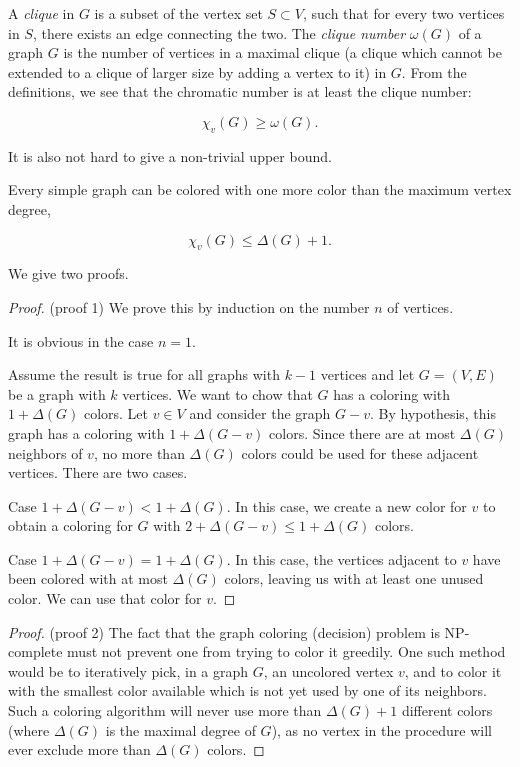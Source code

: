 A {\it clique} in $G$ is a subset of the vertex set $S \subset V$, such that
for every two vertices in $S$, there exists an edge connecting the two.
The {\it clique number} $\omega (G)$ of a graph $G$ is the number of vertices 
in a maximal clique (a clique which cannot be extended to a clique of 
larger size
by adding a vertex to it) in $G$.
From the definitions, we see that
the chromatic number is at least the clique number:

\[
    \chi_v(G) \ge \omega(G).
\]

It is also not hard to give a non-trivial upper bound.

\begin{theorem} 
Every simple graph can be colored with one more color than the 
maximum vertex degree,

\[
    \chi_v(G) \le \Delta(G) + 1. 
\]
\end{theorem}

We give two proofs.

\begin{proof}
(proof 1)
We prove this by induction on the number $n$ of vertices.

It is obvious in the case $n=1$.

Assume the result is true for all graphs with $k-1$ vertices and let
$G=(V,E)$ be a graph with $k$ vertices. We want to chow that $G$ has a
coloring with $1+\Delta(G)$ colors. Let $v\in V$ and consider the
graph $G-v$. By hypothesis, this graph has a coloring with
$1+\Delta(G-v)$ colors. Since there are at most $\Delta(G)$
neighbors of $v$, no more than $\Delta(G)$ colors could be used for 
these adjacent vertices. There are two cases.

Case $1+\Delta(G-v) < 1+\Delta(G)$. In this case, we create a new
color for $v$ to obtain a coloring for $G$ with 
$2+\Delta(G-v) \leq 1+\Delta(G)$ colors.

Case $1+\Delta(G-v) = 1+\Delta(G)$. In this case, the vertices adjacent to
$v$ have been colored with at most $\Delta(G)$ colors, leaving us with
at least one unused color. We can use that color for $v$.

\end{proof}

\begin{proof}
(proof 2)
The fact that the graph coloring (decision) problem
is NP-complete must not prevent one from trying to 
color it greedily. One such 
method would be to iteratively pick, in a graph $G$, an uncolored 
vertex $v$, and to color it with the smallest color available which 
is not yet used by one of its neighbors. 
Such a coloring algorithm will never 
use more than $\Delta(G)+1$ different 
colors (where $\Delta(G)$ is the maximal degree of $G$), as
no vertex in the procedure will ever exclude more than 
$\Delta(G)$ colors.
\end{proof}

